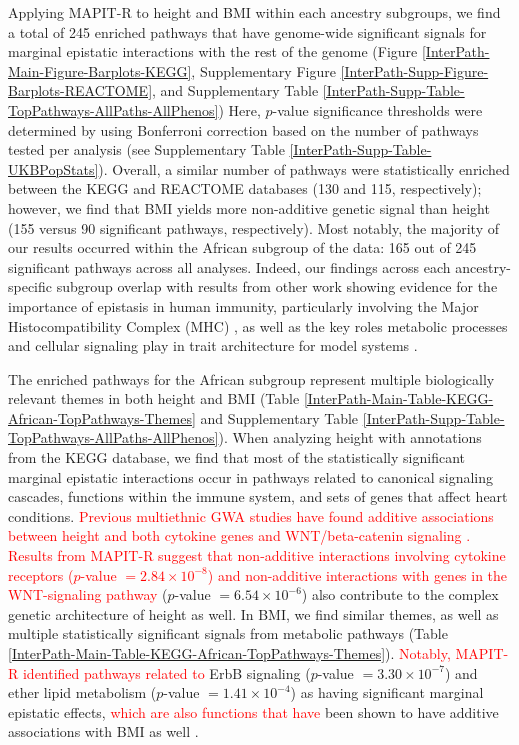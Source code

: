 \documentclass[10pt]{article}
\begin{document}
Applying MAPIT-R to height and BMI within each ancestry subgroups, we find a total of 245 enriched pathways that have genome-wide significant signals for marginal epistatic interactions with the rest of the genome (Figure \ref{InterPath-Main-Figure-Barplots-KEGG}, Supplementary Figure \ref{InterPath-Supp-Figure-Barplots-REACTOME}, and Supplementary Table \ref{InterPath-Supp-Table-TopPathways-AllPaths-AllPhenos}) Here, $p$-value significance thresholds were determined by using Bonferroni correction based on the number of pathways tested per analysis (see Supplementary Table \ref{InterPath-Supp-Table-UKBPopStats}). Overall, a similar number of pathways were statistically enriched between the KEGG and REACTOME databases (130 and 115, respectively); however, we find that BMI yields more non-additive genetic signal than height (155 versus 90 significant pathways, respectively). Most notably, the majority of our results occurred within the African subgroup of the data: 165 out of 245 significant pathways across all analyses. Indeed, our findings across each ancestry-specific subgroup overlap with results from other work showing evidence for the importance of epistasis in human immunity, particularly involving the Major Histocompatibility Complex (MHC) \cite{Martin2002,Williams2005,Wan2010,Rose2012,Lareau2016,Opi2018,Zhang2019}, as well as the key roles metabolic processes and cellular signaling play in trait architecture for model systems \cite{Segre2005,Snitkin2011,Podgornaia2015,Sorrells2015,Tyler2017,Nghe2018,Jiao2019}. 

The enriched pathways for the African subgroup represent multiple biologically relevant themes in both height and BMI (Table \ref{InterPath-Main-Table-KEGG-African-TopPathways-Themes} and Supplementary Table \ref{InterPath-Supp-Table-TopPathways-AllPaths-AllPhenos}). When analyzing height with annotations from the KEGG database, we find that most of the statistically significant marginal epistatic interactions occur in pathways related to canonical signaling cascades, functions within the immune system, and sets of genes that affect heart conditions. \textcolor{red}{Previous multiethnic GWA studies have found additive associations between height and both cytokine genes \cite{Marouli2017} and WNT/beta-catenin signaling \cite{Wood2014b}. Results from MAPIT-R suggest that non-additive interactions involving cytokine receptors ($p$-value $= 2.84\times 10^{-8}$) and non-additive interactions with genes in the WNT-signaling pathway} ($p$-value $= 6.54\times 10^{-6}$) also contribute to the complex genetic architecture of height as well. In BMI, we find similar themes, as well as multiple statistically significant signals from metabolic pathways (Table \ref{InterPath-Main-Table-KEGG-African-TopPathways-Themes}). \textcolor{red}{Notably, MAPIT-R identified pathways related to} ErbB signaling ($p$-value $= 3.30\times 10^{-7}$) and ether lipid metabolism ($p$-value $= 1.41\times 10^{-4}$) as having significant marginal epistatic effects, \textcolor{red}{which are also functions that have} been shown to have additive associations with BMI as well \cite{Locke2015,Salinas2016,Jha2018}. 
\end{document}

